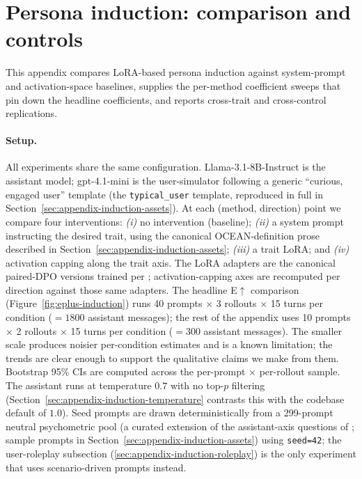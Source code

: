 \section{Persona induction: comparison and controls}\label{sec:appendix-induction-sweeps}

This appendix compares LoRA-based persona induction against system-prompt and activation-space baselines, supplies the per-method coefficient sweeps that pin down the headline coefficients, and reports cross-trait and cross-control replications.

\paragraph{Setup.} All experiments share the same configuration. Llama-3.1-8B-Instruct is the assistant model; gpt-4.1-mini is the user-simulator following a generic ``curious, engaged user'' template (the \texttt{typical\_user} template, reproduced in full in Section~\ref{sec:appendix-induction-assets}). At each (method, direction) point we compare four interventions: \emph{(i)} no intervention (baseline); \emph{(ii)} a system prompt instructing the desired trait, using the canonical OCEAN-definition prose described in Section~\ref{sec:appendix-induction-assets}; \emph{(iii)} a trait LoRA; and \emph{(iv)} activation capping along the trait axis. The LoRA adapters are the canonical paired-DPO versions trained per ; activation-capping axes are recomputed per direction against those same adapters. The headline E$\uparrow$ comparison (Figure~\ref{fig:eplus-induction}) runs 40 prompts $\times$ 3 rollouts $\times$ 15 turns per condition ($= 1800$ assistant messages); the rest of the appendix uses 10 prompts $\times$ 2 rollouts $\times$ 15 turns per condition ($= 300$ assistant messages). The smaller scale produces noisier per-condition estimates and is a known limitation; the trends are clear enough to support the qualitative claims we make from them. Bootstrap 95\% CIs are computed across the per-prompt $\times$ per-rollout sample. The assistant runs at temperature $0.7$ with no top-$p$ filtering (Section~\ref{sec:appendix-induction-temperature} contrasts this with the codebase default of $1.0$). Seed prompts are drawn deterministically from a 299-prompt neutral psychometric pool (a curated extension of the assistant-axis questions of \citet{lu2026assistant}; sample prompts in Section~\ref{sec:appendix-induction-assets}) using \texttt{seed=42}; the user-roleplay subsection (\ref{sec:appendix-induction-roleplay}) is the only experiment that uses scenario-driven prompts instead.

